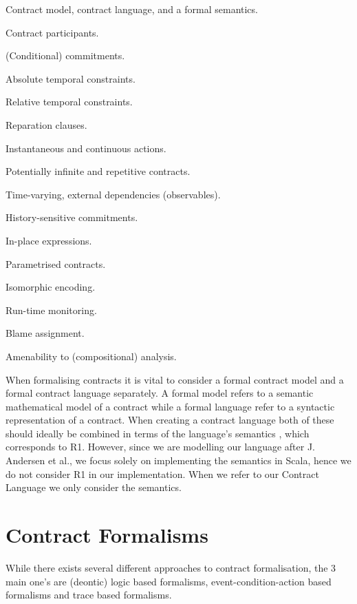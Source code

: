 \documentclass{ituthesis}
\begin{document}
\begin{list}{R:~}{}
    \item Contract model, contract language, and a formal semantics.
    \item Contract participants.
    \item (Conditional) commitments.
    \item Absolute temporal constraints.
    \item Relative temporal constraints.
    \item Reparation clauses.
    \item Instantaneous and continuous actions.
    \item Potentially infinite and repetitive contracts.
    \item Time-varying, external dependencies (observables).
    \item History-sensitive commitments.
    \item In-place expressions.
    \item Parametrised contracts.
    \item Isomorphic encoding.
    \item Run-time monitoring.
    \item Blame assignment.
    \item Amenability to (compositional) analysis.
\end{list}

When formalising contracts it is vital to consider a formal contract model and a formal contract language separately. A formal model refers to a semantic mathematical model of a contract while a formal language refer to a syntactic representation of a contract. When creating a contract language both of these should ideally be combined in terms of the language's semantics \cite{hvitved2011contract}, which corresponds to R1. However, since we are modelling our language after J. Andersen et al., we focus solely on implementing the semantics in Scala, hence we do not consider R1 in our implementation. When we refer to our Contract Language we only consider the semantics.

\section{Contract Formalisms}
While there exists several different approaches to contract formalisation, the 3 main one's are (deontic) logic based formalisms, event-condition-action based formalisms and trace based formalisms. 
\end{document}
